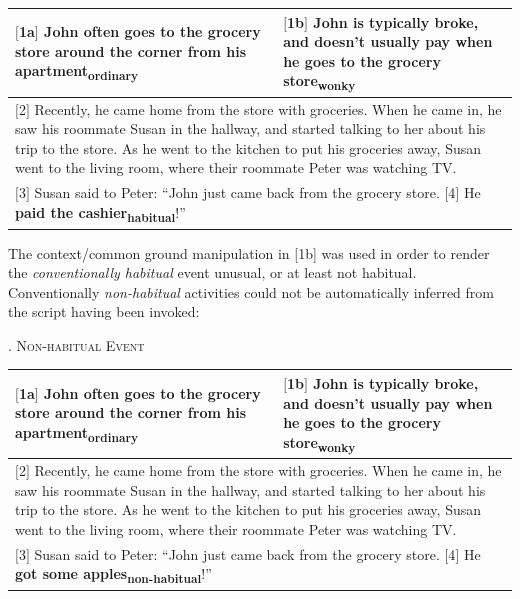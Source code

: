 \documentclass{sp}\usepackage[]{graphicx}\usepackage[]{color}
\begin{document}
\begin{longtable}{p{}|p{}}
$[$1a$]$ John \textbf{often goes to the grocery store around the corner from his apartment\textsubscript{ordinary}} & $[$1b$]$ John \textbf{is typically broke, and doesn't usually pay when he goes to the grocery store\textsubscript{wonky}}          \\
\hline
\multicolumn{2}{p{0.9\textwidth}}{$[$2$]$ Recently, he came home from the store with groceries.  When he came in, he saw his roommate Susan in the hallway, and started talking to her about his trip to the store.  As he went to the kitchen to put his groceries away, Susan went to the living room, where their roommate Peter was watching TV.} \\
\hline
\multicolumn{2}{p{0.9\textwidth}}{$[$3$]$ Susan said to Peter: ``John just came back from the grocery store. $[$4$]$ He \textbf{paid the \mbox{cashier\textsubscript{habitual}}}!''}
\end{longtable}
\addtocounter{table}{-1}

The context/common ground manipulation in [1b] was used in order to render the \textit{conventionally habitual} event unusual, or at least not habitual. Conventionally \textit{non-habitual} activities could not be automatically inferred from the script having been invoked: 

\ex.\label{ex:nonhabitual1} \centering\textsc{Non-habitual Event}
\vspace{-0.1cm}
\centering

\begin{longtable}{p{}|p{}}
$[$1a$]$ John \textbf{often goes to the grocery store around the corner from his apartment\textsubscript{ordinary}} & $[$1b$]$ John \textbf{is typically broke, and doesn't usually pay when he goes to the grocery store\textsubscript{wonky}}          \\
\hline
\multicolumn{2}{p{0.9\textwidth}}{$[$2$]$ Recently, he came home from the store with groceries.  When he came in, he saw his roommate Susan in the hallway, and started talking to her about his trip to the store.  As he went to the kitchen to put his groceries away, Susan went to the living room, where their roommate Peter was watching TV.} \\
\hline
\multicolumn{2}{p{0.9\textwidth}}{$[$3$]$ Susan said to Peter: ``John just came back from the grocery store. $[$4$]$ He \textbf{got some \mbox{apples\textsubscript{non-habitual}}}!''}
\end{longtable}
\addtocounter{table}{-1}
\end{document}
